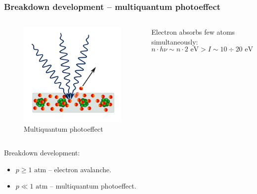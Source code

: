 \documentclass{beamer}
\begin{document}
	\begin{frame}
		\frametitle{Breakdown development -- multiquantum photoeffect}
		
		\begin{columns}
			\begin{figure}
				\centering
				\includegraphics[width=0.9\linewidth]{res/multiphoton.png}
				\caption*{Multiquantum photoeffect}
			\end{figure}
			
			Electron absorbs few atoms simultaneously: 
			$$n \cdot h\nu \sim n \cdot 2 \text{ eV} > I \sim 10 \div 20 \text{ eV}$$
		\end{columns}
		
		Breakdown development:
		\begin{itemize}
			\item $p \geqslant 1\text{ atm}$ -- electron avalanche.
			\item $p \ll 1\text{ atm}$ -- multiquantum photoeffect.
		\end{itemize}
	\end{frame}
	
\end{document}
